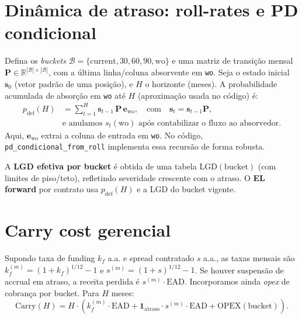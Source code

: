 \documentclass[11pt,a4paper]{article}
\newcommand{\1}{\mathbf{1}}
\newcommand{\vect}[1]{\bm{#1}}
\begin{document}
\section{Dinâmica de atraso: roll-rates e PD condicional}
Defina os \emph{buckets} $\mathcal{B}=\{\text{current},30,60,90,\text{wo}\}$ e uma matriz de transição mensal $\mathbf{P}\in\mathbb{R}^{|\mathcal{B}|\times|\mathcal{B}|}$, com a última linha/coluna absorvente em \texttt{wo}. Seja o estado inicial $\vect{s}_0$ (vetor padrão de uma posição), e $H$ o horizonte (meses). A probabilidade acumulada de absorção em \texttt{wo} até $H$ (aproximação usada no código) é:
\begin{align}
p_{\text{def}}(H)
&= \sum_{t=1}^{H} \vect{s}_{t-1}\, \mathbf{P}\,\vect{e}_{\text{wo}}, \quad \text{com}\quad \vect{s}_{t} = \vect{s}_{t-1}\mathbf{P}, \\
&\text{e anulamos } s_t(\text{wo}) \text{ após contabilizar o fluxo ao absorvedor}.
\end{align}
Aqui, $\vect{e}_{\text{wo}}$ extrai a coluna de entrada em \texttt{wo}. No código, \texttt{pd\_condicional\_from\_roll} implementa essa recursão de forma robusta.

A \textbf{LGD efetiva por bucket} é obtida de uma tabela $\mathrm{LGD}(\text{bucket})$ (com limites de piso/teto), refletindo severidade crescente com o atraso. O \textbf{EL forward} por contrato usa $p_{\text{def}}(H)$ e a LGD do bucket vigente.

\section{Carry cost gerencial}
Supondo taxa de funding $k_f$ a.a. e spread contratado $s$ a.a., as taxas mensais são $k_f^{(m)}=(1+k_f)^{1/12}-1$ e $s^{(m)}=(1+s)^{1/12}-1$. Se houver suspensão de accrual em atraso, a receita perdida é $s^{(m)}\cdot \text{EAD}$. Incorporamos ainda \emph{opex} de cobrança por bucket. Para $H$ meses:
\begin{equation}
\mathrm{Carry}(H) = H\cdot\left( k_f^{(m)}\cdot \text{EAD} + \mathbf{1}_{\text{atraso}}\cdot s^{(m)}\cdot \text{EAD} + \mathrm{OPEX}(\text{bucket})\right).
\end{equation}
\end{document}
